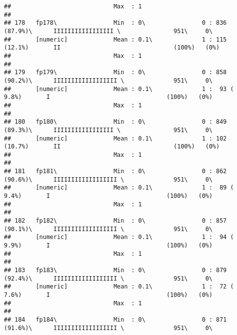 \documentclass[]{article}
\begin{document}
\begin{verbatim}
##                             Max  : 1                                                                                           
## 
## 178   fp178\                Min  : 0\                0 : 836 (87.9%)\      IIIIIIIIIIIIIIIII \               951\     0\       
##       [numeric]             Mean : 0.1\              1 : 115 (12.1%)       II                                (100%)   (0%)     
##                             Max  : 1                                                                                           
## 
## 179   fp179\                Min  : 0\                0 : 858 (90.2%)\      IIIIIIIIIIIIIIIIII \              951\     0\       
##       [numeric]             Mean : 0.1\              1 :  93 ( 9.8%)       I                                 (100%)   (0%)     
##                             Max  : 1                                                                                           
## 
## 180   fp180\                Min  : 0\                0 : 849 (89.3%)\      IIIIIIIIIIIIIIIII \               951\     0\       
##       [numeric]             Mean : 0.1\              1 : 102 (10.7%)       II                                (100%)   (0%)     
##                             Max  : 1                                                                                           
## 
## 181   fp181\                Min  : 0\                0 : 862 (90.6%)\      IIIIIIIIIIIIIIIIII \              951\     0\       
##       [numeric]             Mean : 0.1\              1 :  89 ( 9.4%)       I                                 (100%)   (0%)     
##                             Max  : 1                                                                                           
## 
## 182   fp182\                Min  : 0\                0 : 857 (90.1%)\      IIIIIIIIIIIIIIIIII \              951\     0\       
##       [numeric]             Mean : 0.1\              1 :  94 ( 9.9%)       I                                 (100%)   (0%)     
##                             Max  : 1                                                                                           
## 
## 183   fp183\                Min  : 0\                0 : 879 (92.4%)\      IIIIIIIIIIIIIIIIII \              951\     0\       
##       [numeric]             Mean : 0.1\              1 :  72 ( 7.6%)       I                                 (100%)   (0%)     
##                             Max  : 1                                                                                           
## 
## 184   fp184\                Min  : 0\                0 : 871 (91.6%)\      IIIIIIIIIIIIIIIIII \              951\     0\       

\end{verbatim}
\end{document}
